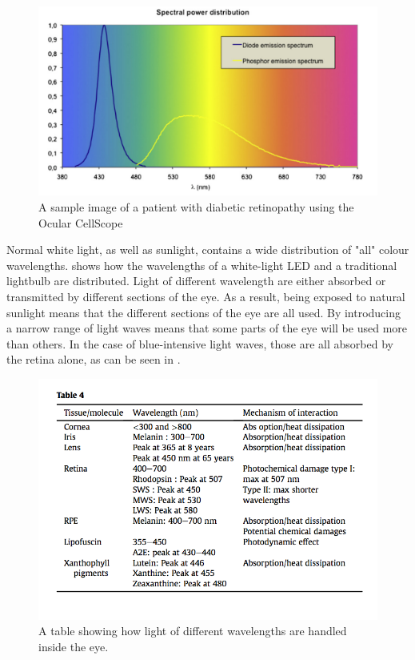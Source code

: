 \begin{figure}[htbp]
\centering
 \includegraphics{figures/bluehazard}
\caption{A sample image of a patient with diabetic retinopathy using the Ocular CellScope}
\label{fig:bluehaz}
\end{figure}

Normal white light, as well as sunlight, contains a wide distribution of "all" colour
wavelengths.  shows how the wavelengths of a white-light LED and a
traditional lightbulb are distributed. Light of different wavelength are either absorbed
or transmitted by different sections of the eye. As a result, being exposed to natural
sunlight means that the different sections of the eye are all used. By introducing a
narrow range of light waves means that some parts of the eye will be used more than
others. In the case of blue-intensive light waves, those are all absorbed by the retina
alone, as can be seen in .

\begin{figure}[htbp]
\centering
 \includegraphics{figures/wavelength}
\caption{A table showing how light of different wavelengths are handled inside the eye.}
\label{fig:wl}
\end{figure}

